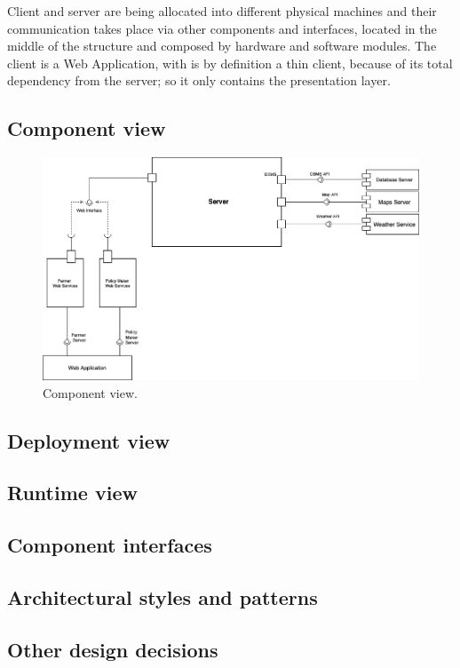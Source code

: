 Client and server are being allocated into different physical machines and their communication takes place via other components and interfaces, located in the middle of the structure and composed by hardware and software modules. 
The client is a Web Application, with is by definition a thin client, because of its total dependency from the server; so it only contains the presentation layer.


\subsection{Component view}

\begin{figure}[H]
    \begin{center}
    \includegraphics[width=1.2\textwidth]{images/Component1.png}
    \caption{Component view.}
    \label{fig:component view}
    \end{center}
\end{figure}

\subsection{Deployment view}

\subsection{Runtime view}

\subsection{Component interfaces}

\subsection{Architectural styles and patterns}

\subsection{Other design decisions}

